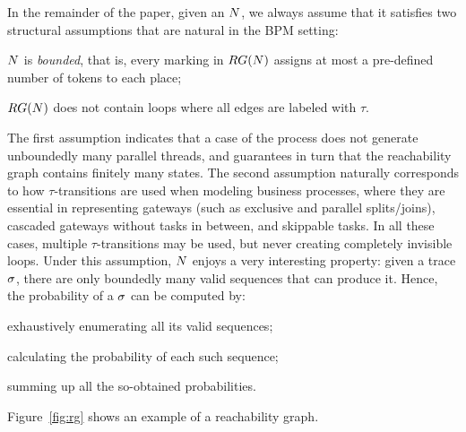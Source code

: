 In the remainder of the paper, given an \uswn $N$, we always assume that it satisfies two structural assumptions that are natural in the BPM setting:
\begin{compactitem}
\item $N$ is \emph{bounded}, that is, every marking in $RG(N)$ assigns at most a pre-defined number of tokens to each place;
\item $RG(N)$ does not contain loops where all edges are labeled with $\tau$.
\end{compactitem}
The first assumption indicates that a case of the process does not generate unboundedly many parallel threads, and guarantees in turn that the reachability graph contains finitely many states. The second assumption naturally corresponds to how $\tau$-transitions are used when modeling business processes, where they are essential in representing gateways (such as exclusive and parallel splits/joins), cascaded gateways without tasks in between, and skippable tasks.  In all these cases, multiple $\tau$-transitions may be used, but never creating completely invisible loops. Under this assumption, $N$ enjoys a very interesting property: given a trace $\sigma$, there are only boundedly many valid sequences that can produce it. Hence, the probability of a $\sigma$ can be computed by:
\begin{inparaenum}[\it (i)]
\item exhaustively enumerating all its valid sequences;
\item calculating the probability of each such sequence;
\item summing up all the so-obtained probabilities.
\end{inparaenum}
Figure~\eqref{fig:rg} shows an example of a reachability graph.





